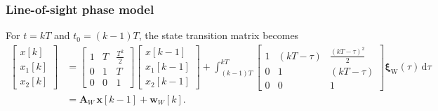 \documentclass[
    hyperref={colorlinks,citecolor=DeepPink4,linkcolor=DarkRed,urlcolor=DarkBlue}
]{beamer_class}
\begin{document}
\begin{frame}[t]
    \frametitle{Line-of-sight phase model}
    For \(t = kT\) and \(t_0 = (k-1)T\), the state transition matrix becomes
    \begin{align}
        \begin{bmatrix} x[k] \\
        x_{1}[k] \\
        x_{2}[k] \end{bmatrix} &= \begin{bmatrix} 1 & T & \tfrac{T^{2}}{2} \\
        0 & 1 & T \\
        0 & 0 & 1 \end{bmatrix} \begin{bmatrix} x[k-1] \\
        x_{1}[k-1] \\
        x_{2}[k-1] \end{bmatrix} 
        + \int_{(k-1)T}^{kT} \begin{bmatrix} 1 & (kT-\tau) & \tfrac{(kT-\tau)^{2}}{2} \\
        0 & 1 & (kT-\tau) \\
        0 & 0 & 1 \end{bmatrix} \boldsymbol{\xi}_{\mathrm{W}}(\tau)\,\mathrm{d}\tau \nonumber \\
        &= \mathbf{A}_{W}\,\mathbf{x}[k-1] + \mathbf{w}_{W}[k].
    \end{align}
\end{frame}
\end{document}
